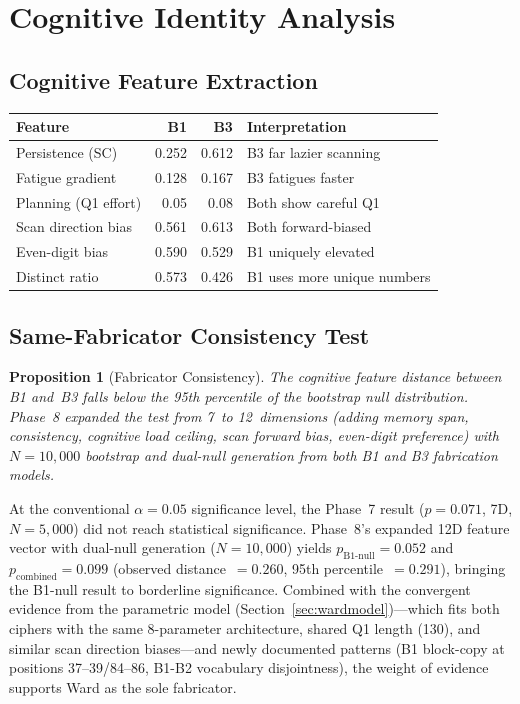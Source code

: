 \documentclass[11pt,a4paper]{article}
\newtheorem{proposition}[theorem]{Proposition}
\begin{document}
\section{Cognitive Identity Analysis}
\label{sec:cognitive}

\subsection{Cognitive Feature Extraction}

\begin{center}
\begin{tabular}{@{}lrrl@{}}
\toprule
\textbf{Feature} & \textbf{B1} & \textbf{B3} & \textbf{Interpretation} \\
\midrule
Persistence (SC) & 0.252 & 0.612 & B3 far lazier scanning \\
Fatigue gradient & 0.128 & 0.167 & B3 fatigues faster \\
Planning (Q1 effort) & 0.05 & 0.08 & Both show careful Q1 \\
Scan direction bias & 0.561 & 0.613 & Both forward-biased \\
Even-digit bias & 0.590 & 0.529 & B1 uniquely elevated \\
Distinct ratio & 0.573 & 0.426 & B1 uses more unique numbers \\
\bottomrule
\end{tabular}
\end{center}

\subsection{Same-Fabricator Consistency Test}

\begin{proposition}[Fabricator Consistency]
\label{prop:samefab}
The cognitive feature distance between B1 and~B3 falls below
the 95th percentile of the bootstrap null distribution.
Phase~8 expanded the test from 7~to 12~dimensions (adding memory span,
consistency, cognitive load ceiling, scan forward bias, even-digit
preference) with $N{=}10{,}000$ bootstrap and dual-null generation from
both B1 and B3 fabrication models.
\end{proposition}

At the conventional $\alpha{=}0.05$ significance level, the Phase~7
result ($p{=}0.071$, 7D, $N{=}5{,}000$) did not reach statistical significance.
Phase~8's expanded 12D feature vector with dual-null generation ($N{=}10{,}000$)
yields $p_{\text{B1-null}}{=}0.052$ and $p_{\text{combined}}{=}0.099$
(observed distance~$= 0.260$, 95th percentile~$= 0.291$), bringing the
B1-null result to borderline significance. Combined with the convergent evidence from
the parametric model (Section~\ref{sec:wardmodel})---which fits both ciphers
with the same 8-parameter architecture, shared Q1 length (130), and similar
scan direction biases---and newly documented patterns (B1 block-copy at
positions 37--39/84--86, B1-B2 vocabulary disjointness), the weight of
evidence supports Ward as the sole fabricator.
\end{document}
